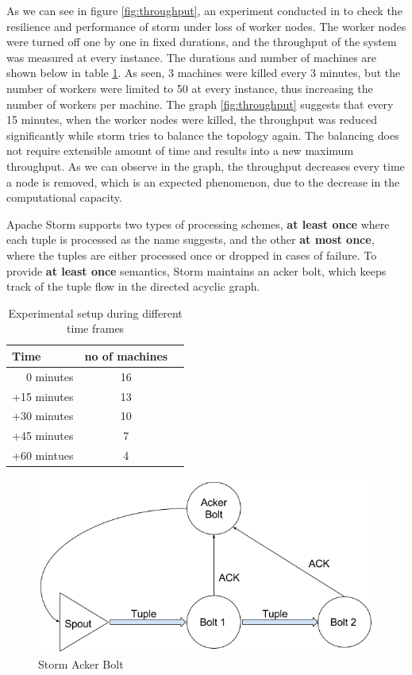\documentclass[runningheads,a4paper]{llncs}[2015/06/24]
\begin{document}
As we can see in figure \ref{fig:throughput}, an experiment conducted in \cite{stormtwitter} to check the resilience and performance of storm under loss of worker nodes. The worker nodes were turned off one by one in fixed durations, and the throughput of the system was measured at every instance. The durations and number of machines are shown below in table \ref{tab:experiment}. As seen, 3 machines were killed every 3 minutes, but the number of workers were limited to 50 at every instance, thus increasing the number of workers per machine. The graph \ref{fig:throughput} suggests that every 15 minutes, when the worker nodes were killed, the throughput was reduced significantly while storm tries to balance the topology again. The balancing does not require extensible amount of time and results into a new maximum throughput. As we can observe in the graph, the throughput decreases every time a node is removed, which is an expected phenomenon, due to the decrease in the computational capacity.

Apache Storm supports two types of processing schemes, \textbf{at least once} where each tuple is processed as the name suggests, and the other \textbf{at most once}, where the tuples are either processed once or dropped in cases of failure. To provide \textbf{at least once} semantics, Storm maintains an acker bolt, which keeps track of the tuple flow in the directed acyclic graph.

\begin{table}
\caption{Experimental setup during different time frames}
\label{tab:experiment}
\begin{center}
\begin{tabular}{r@{\quad}cl}
\hline
\multicolumn{1}{l}{\rule{0pt}{12pt} 
	Time}&\multicolumn{1}{l}{no of machines}\\[2pt]
\hline\rule{0pt}{12pt}
0 minutes  & 16  \\
+15 minutes & 13 \\
+30 minutes & 10 \\
+45 minutes & 7 \\
+60 mintues & 4 \\[2pt]
\hline
\end{tabular}
\end{center}
\end{table}

\begin{figure}
  \begin{center}
    \includegraphics[width=.7\textwidth]{acker.png}
    \caption{Storm Acker Bolt \cite{stormtwitter}}
    \label{fig:acker}
   \end{center}
\end{figure}
\end{document}
